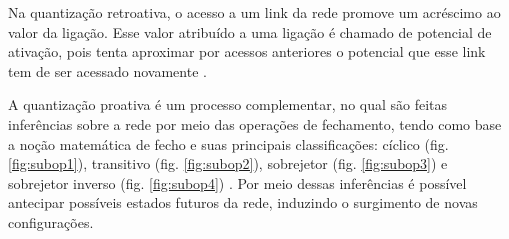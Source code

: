 Na quantização retroativa, o acesso a um link da rede promove um acréscimo ao valor da ligação. Esse valor atribuído a uma ligação é chamado de potencial de ativação, pois tenta aproximar por acessos anteriores o potencial que esse link tem de ser acessado novamente \cite{palazzo2000}.

A quantização proativa é um processo complementar, no qual são feitas inferências sobre a rede por meio das operações de fechamento, tendo como base a noção matemática de fecho e suas principais classificações: cíclico (fig. \ref{fig:subop1}), transitivo (fig. \ref{fig:subop2}), sobrejetor (fig. \ref{fig:subop3}) e sobrejetor inverso (fig. \ref{fig:subop4}) \cite{palazzo2000, fragelli2010}. Por meio dessas inferências é possível antecipar possíveis estados futuros da rede, induzindo o surgimento de novas configurações.

